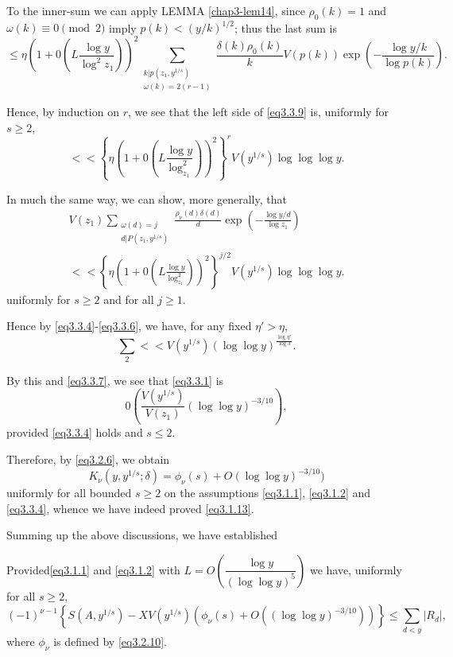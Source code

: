 To the inner-sum we can apply LEMMA \ref{chap3-lem14}, since
$\rho_0(k)=1$ and $\omega(k)\equiv 0 \pmod{2}$ imply $p(k)<
(y/k)^{1/2}$; thus the last sum is  
$$
   \le \eta\left(1+0\left(L\frac{\log y}{\log^2 z_1}\right)\right)^2
   \sum_{\substack{k|p(z_1,y^{1/s})\\{\omega(k)=2(r-1)}}}\frac{\delta(k)
     \rho_0(k)}{k} V(p(k))\exp\left(-\frac{\log y/k}{\log p(k)}\right). 
$$

Hence, by induction on $r$, we see that the left side of \eqref{eq3.3.9} is,
uniformly for $s \ge 2$, 
$$
<< \left\{ \eta \left(1+0\left(L \frac{\log
  y}{\log^2_{z_1}}\right)\right)^2\right\}^r V(y^{1/s})\log \log \log y. 
$$\pageoriginale

In much the same way, we can show, more generally, that
\begin{multline*}
  V(z_1) \sum_{\substack{\omega (d) = j \\{d
        |P(z_1,y^{1/s})}}}\frac{\rho_\nu (d)\delta(d)}{d}
  \exp\left(-\frac{\log y/d}{\log z_1}\right) \\
 << \left\{ \eta \left(1+0\left(L \frac{\log
    y}{\log^2_{z_1}}\right)\right)^2\right\}^{j/2}
  V(y^{1/s})\log \log \log y. 
\end{multline*}
uniformly for $s \ge 2$ and for all $j \ge 1$.

Hence by \eqref{eq3.3.4}-\eqref{eq3.3.6}, we have, for any fixed
$\eta' > \eta$, 
$$
\sum_2 << V(y^{1/s}) (\log \log y)^{\frac{\log \eta'}{\log 3}}.
$$

By this and \eqref{eq3.3.7}, we see that \eqref{eq3.3.1} is 
$$
0\left(\frac {V(y^{1/s})}{V(z_1)}(\log \log y)^{-3/10}\right),
$$
provided \eqref{eq3.3.4} holds and $s \le 2$.

Therefore, by \eqref{eq3.2.6}, we obtain
$$
K_\nu (y,y^{1/s};\delta) = \phi_\nu (s)+ O(\log \log y)^{-3/10})
$$
uniformly for all bounded $s\ge 2$ on the assumptions \eqref{eq3.1.1},
\eqref{eq3.1.2} and \eqref{eq3.3.4}, whence we have indeed proved
\eqref{eq3.1.13}.   

Summing up the above discussions, we have established

\begin{theorem}\label{chap3-thm9}%
 Provided\pageoriginale \eqref{eq3.1.1} and \eqref{eq3.1.2} with $L=O
  \left(\dfrac{\log y}{(\log \log y)^5}\right)$ we have, uniformly for
  all $s \ge   2$, 
$$
  (-1)^{\nu-1}\left\{S(A,y^{1/s}) - XV(y^{1/s}) (\phi_\nu (s)+O((\log \log
  y)^{-3/10}))\right\} \le \sum_{d<y}|R_d|, 
$$
where $\phi_\nu$ is defined by \eqref{eq3.2.10}.
\end{theorem}

